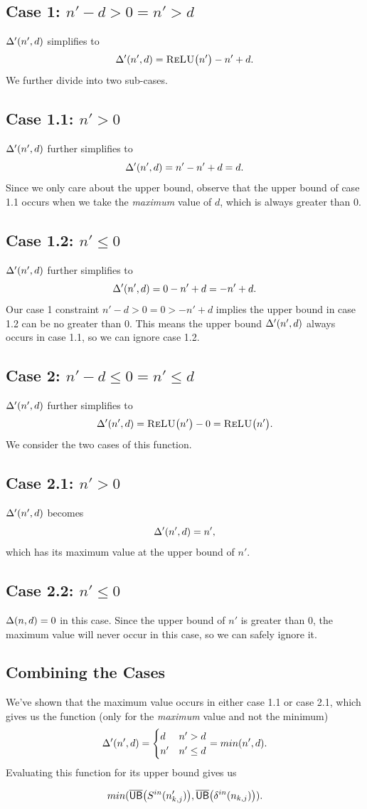 \subsection*{Case 1: $ n' - d > 0 = n' > d $}
$ \Delta'(n',d) $ simplifies to
\[
\Delta'(n',d) = \textsc{ReLU}\big(n'\big) - n' + d.
\]
We further divide into two sub-cases.

\subsection*{Case 1.1: $ n' > 0 $}
$ \Delta'(n',d) $ further simplifies to
\[
\Delta'(n',d) = n' - n' + d = d.
\]
Since we only care about the upper bound, observe that the upper bound of
case 1.1 occurs when we take the \textit{maximum} value of $ d $, which is always greater than 0.

\subsection*{Case 1.2: $ n' \leq 0 $}
$ \Delta'(n',d) $ further simplifies to
\[
\Delta'(n',d) = 0 - n' + d = -n' + d.
\]
Our case 1 constraint $ n' - d > 0 = 0 > -n' + d $ implies the upper bound in case 1.2
can be no greater than 0. This means the upper bound $ \Delta'(n',d) $ always occurs in case 1.1, so we
can ignore case 1.2.

\subsection*{Case 2: $ n' - d \leq 0 = n' \leq d $}
$ \Delta'(n',d) $ further simplifies to
\[
\Delta'(n',d) = \textsc{ReLU}\big(n'\big) - 0 = \textsc{ReLU}\big(n'\big).
\]
We consider the two cases of this function.
\subsection*{Case 2.1: $ n' > 0 $}
$ \Delta'(n',d) $ becomes
\[
	\Delta'(n',d) = n',
\]
which has its maximum value at the upper bound of $ n' $.

\subsection*{Case 2.2: $ n' \leq 0 $}
$ \Delta(n,d) = 0 $ in this case. Since the upper bound of $ n' $ is greater than 0, the maximum value will never occur in this case, so we can safely ignore it.


\subsection*{Combining the Cases}
We've shown that the maximum value occurs in either case 1.1 or case 2.1, which gives us the function (only for the \textit{maximum} value and not the minimum)
\[
\Delta'(n',d) = \begin{cases}
d & n' > d\\
n' & n' \leq d
\end{cases} = min(n',d).
\]
Evaluating this function for its upper bound gives us

\[
	min(\overline{\mathsf{UB}}\big(S^{in}(n'_{k,j})\big), \overline{\mathsf{UB}}\big(\delta^{in}(n_{k,j})\big)).
\]


